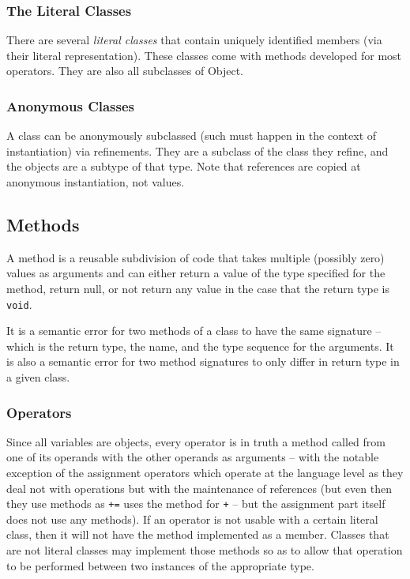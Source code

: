 \subsubsection{The Literal Classes}
There are several \textit{literal classes} that contain uniquely identified members (via their literal representation). These classes come with methods developed for most operators. They are also all subclasses of Object.

\subsubsection{Anonymous Classes}
A class can be anonymously subclassed (such must happen in the context of instantiation) via refinements. They are a subclass of the class they refine, and the objects are a subtype of that type. Note that references are copied at anonymous instantiation, not values.

\subsection{Methods}
A method is a reusable subdivision of code that takes multiple (possibly zero) values as arguments and can either return a value of the type specified for the method, return null, or not return any value in the case that the return type is \verb!void!.

It is a semantic error for two methods of a class to have the same signature -- which is the return type, the name, and the type sequence for the arguments. It is also a semantic error for two method signatures to only differ in return type in a given class.

\subsubsection{Operators}
Since all variables are objects, every operator is in truth a method called from one of its operands with the other operands as arguments -- with the notable exception of the assignment operators which operate at the language level as they deal not with operations but with the maintenance of references (but even then they use methods as \verb!+=! uses the method for \verb!+! -- but the assignment part itself does not use any methods). If an operator is not usable with a certain literal class, then it will not have the method implemented as a member. Classes that are not literal classes may implement those methods so as to allow that operation to be performed between two instances of the appropriate type.

